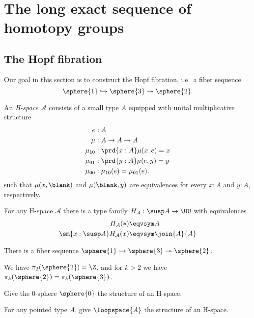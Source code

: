 \chapter{The long exact sequence of homotopy groups}

\section{The Hopf fibration}
Our goal in this section is to construct the Hopf fibration, i.e.~a fiber sequence
\begin{equation*}
\sphere{1}\hookrightarrow\sphere{3}\twoheadrightarrow\sphere{2}.
\end{equation*}

\begin{defn}
An \emph{H-space} $\mathcal{A}$ consists of a small type $A$ equipped with unital multiplicative structure
\begin{align*}
e & : A \\
\mu & : A\to A\to A\\
\mu_{10} & : \prd{x:A} \mu(x,e)=x \\
\mu_{01} & : \prd{y:A} \mu(e,y)=y \\
\mu_{00} & : \mu_{10}(e)=\mu_{01}(e).
\end{align*}
such that $\mu(x,\blank)$ and $\mu(\blank,y)$ are equivalences for every $x:A$ and $y:A$, respectively.
\end{defn}

\begin{thm}
For any H-space $\mathcal{A}$ there is a type family $H_{\mathcal{A}}:\susp A\to \UU$ with equivalences
\begin{align*}
H_{\mathcal{A}}(\ast) & \eqvsym A \\
\sm{x:\susp A}H_{\mathcal{A}}(x) & \eqvsym \join{A}{A}
\end{align*}
\end{thm}

\begin{thm}
There is a fiber sequence $\sphere{1}\hookrightarrow\sphere{3}\twoheadrightarrow\sphere{2}$. 
\end{thm}

\begin{cor}
We have $\pi_2(\sphere{2})=\Z$, and for $k>2$ we have $\pi_k(\sphere{2})=\pi_k(\sphere{3})$.
\end{cor}


\begin{exercises}
\item Give the $0$-sphere $\sphere{0}$ the structure of an H-space.
\item For any pointed type $A$, give $\loopspace{A}$ the structure of an H-space.
\end{exercises}
